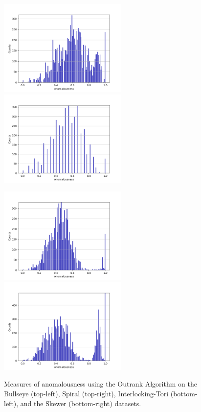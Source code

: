 \begin{figure}[!t]
\centering
\includegraphics[width=2.5in]{static/bullseye_outrank.png}\includegraphics[width=2.5in]{static/spiral_outrank.png}

\includegraphics[width=2.5in]{static/interlocking_tori_outrank.png}\includegraphics[width=2.5in]{static/skewer_outrank.png}

\caption{
Measures of anomalousness using the Outrank Algorithm on the Bullseye (top-left), Spiral (top-right), Interlocking-Tori (bottom-left), and the Skewer (bottom-right) datasets.
}

\label{results:histograms:outrank}
\end{figure}


